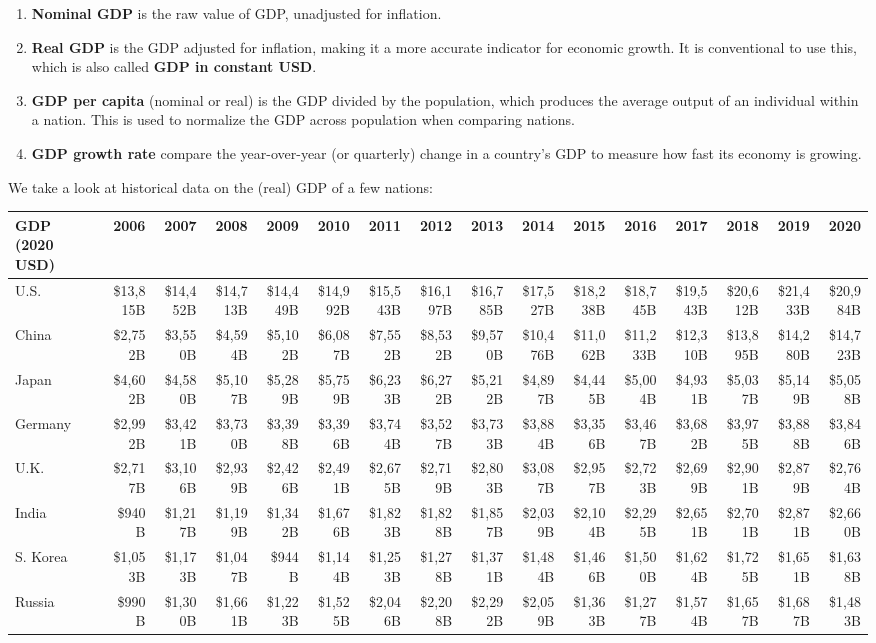 \documentclass{article}
\begin{document}
  \begin{enumerate}
    \item \textbf{Nominal GDP} is the raw value of GDP, unadjusted for inflation.
    \item \textbf{Real GDP} is the GDP adjusted for inflation, making it a more accurate indicator for economic growth. It is conventional to use this, which is also called \textbf{GDP in constant USD}.
    \item \textbf{GDP per capita} (nominal or real) is the GDP divided by the population, which produces the average output of an individual within a nation. This is used to normalize the GDP across population when comparing nations.
    \item \textbf{GDP growth rate} compare the year-over-year (or quarterly) change in a country's GDP to measure how fast its economy is growing.
  \end{enumerate}

  We take a look at historical data on the (real) GDP of a few nations:

  \begin{table}[H]
    \begin{tabular}{lrrrrrrrrrrrrrrr}
    \hline
    GDP (2020 USD) & 2006 & 2007 & 2008 & 2009 & 2010 & 2011 & 2012 & 2013 & 2014 & 2015 & 2016 & 2017 & 2018 & 2019 & 2020 \\
    \hline
    U.S. & \$13,815B & \$14,452B & \$14,713B & \$14,449B & \$14,992B & \$15,543B & \$16,197B & \$16,785B & \$17,527B & \$18,238B & \$18,745B & \$19,543B & \$20,612B & \$21,433B & \$20,984B \\
    China & \$2,752B & \$3,550B & \$4,594B & \$5,102B & \$6,087B & \$7,552B & \$8,532B & \$9,570B & \$10,476B & \$11,062B & \$11,233B & \$12,310B & \$13,895B & \$14,280B & \$14,723B \\
    Japan & \$4,602B & \$4,580B & \$5,107B & \$5,289B & \$5,759B & \$6,233B & \$6,272B & \$5,212B & \$4,897B & \$4,445B & \$5,004B & \$4,931B & \$5,037B & \$5,149B & \$5,058B \\
    Germany & \$2,992B & \$3,421B & \$3,730B & \$3,398B & \$3,396B & \$3,744B & \$3,527B & \$3,733B & \$3,884B & \$3,356B & \$3,467B & \$3,682B & \$3,975B & \$3,888B & \$3,846B \\
    U.K. & \$2,717B & \$3,106B & \$2,939B & \$2,426B & \$2,491B & \$2,675B & \$2,719B & \$2,803B & \$3,087B & \$2,957B & \$2,723B & \$2,699B & \$2,901B & \$2,879B & \$2,764B \\
    India & \$940B & \$1,217B & \$1,199B & \$1,342B & \$1,676B & \$1,823B & \$1,828B & \$1,857B & \$2,039B & \$2,104B & \$2,295B & \$2,651B & \$2,701B & \$2,871B & \$2,660B \\
    S. Korea & \$1,053B & \$1,173B & \$1,047B & \$944B & \$1,144B & \$1,253B & \$1,278B & \$1,371B & \$1,484B & \$1,466B & \$1,500B & \$1,624B & \$1,725B & \$1,651B & \$1,638B \\
    Russia & \$990B & \$1,300B & \$1,661B & \$1,223B & \$1,525B & \$2,046B & \$2,208B & \$2,292B & \$2,059B & \$1,363B & \$1,277B & \$1,574B & \$1,657B & \$1,687B & \$1,483B \\
    \hline 
    \end{tabular}
  \end{table}
\end{document}
